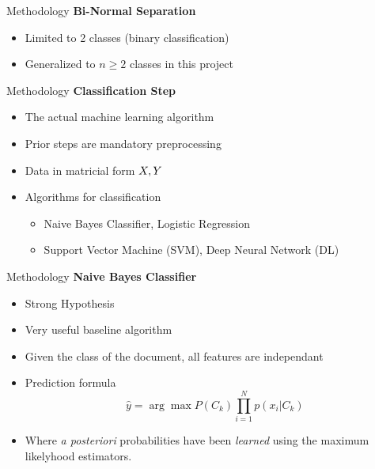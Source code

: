 \begin{frame}[label=metho]{Methodology}
	\textbf{Bi-Normal Separation}
	\begin{itemize}
		\item Limited to 2 classes (binary classification)
		\item Generalized to $n \geq 2$ classes in this project
	\end{itemize}
\end{frame}


\begin{frame}[label=metho]{Methodology}
	\textbf{Classification Step}
	\begin{itemize}
		\item The actual machine learning algorithm
		\item Prior steps are mandatory preprocessing
		\item Data in matricial form $\boldmath{X}, \boldmath{Y}$ 
		\item Algorithms for classification
		\begin{itemize}
			\item Naive Bayes Classifier, Logistic Regression
			\item Support Vector Machine (SVM), Deep Neural Network (DL)
		\end{itemize}
	\end{itemize}
\end{frame}


\begin{frame}[label=metho]{Methodology}
	\textbf{Naive Bayes Classifier}
	\begin{itemize}
		\item Strong Hypothesis
		\item Very useful baseline algorithm
		\item Given the class of the document, all features are independant
		\item Prediction formula
		$$\hat{y} = \arg\max P(C_k) \prod_{i=1}^{N}p(x_i|C_k)$$
		\item Where \textit{a posteriori} probabilities have been \textit{learned} using the maximum likelyhood estimators.
		
	\end{itemize}
	
	
	
\end{frame}




